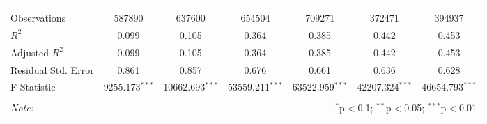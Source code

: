 \begin{tabular}{@{\extracolsep{5pt}}lcccccc}
\hline \\[-1.8ex]
 Observations & 587890 & 637600 & 654504 & 709271 & 372471 & 394937 \\
 $R^2$ & 0.099 & 0.105 & 0.364 & 0.385 & 0.442 & 0.453 \\
 Adjusted $R^2$ & 0.099 & 0.105 & 0.364 & 0.385 & 0.442 & 0.453 \\
 Residual Std. Error & 0.861  & 0.857  & 0.676  & 0.661  & 0.636  & 0.628  \\
 F Statistic & 9255.173$^{***}$  & 10662.693$^{***}$  & 53559.211$^{***}$  & 63522.959$^{***}$  & 42207.324$^{***}$  & 46654.793$^{***}$  \\
\hline
\hline \\[-1.8ex]
\textit{Note:} & \multicolumn{6}{r}{$^{*}$p$<$0.1; $^{**}$p$<$0.05; $^{***}$p$<$0.01} \\
\end{tabular}
